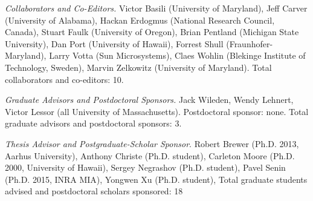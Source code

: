 \begin{Collaborators and other affiliations}
\item {\em Collaborators and Co-Editors.} 
Victor Basili (University of Maryland),
Jeff Carver (University of Alabama),
Hackan Erdogmus (National Research Council, Canada), 
Stuart Faulk (University of Oregon),
Brian Pentland (Michigan State University),
Dan Port (University of Hawaii),
Forrest Shull (Fraunhofer-Maryland),
Larry Votta (Sun Microsystems),
Claes Wohlin (Blekinge Institute of Technology, Sweden),
Marvin Zelkowitz (University of Maryland).
Total collaborators and co-editors: 10.
\medskip

\item {\em Graduate Advisors and Postdoctoral Sponsors.} 
Jack Wileden, Wendy Lehnert, Victor Lessor (all University of Massachusetts).  Postdoctoral sponsor: none.  Total graduate advisors and postdoctoral sponsors: 3.
\medskip

\item {\em Thesis Advisor and Postgraduate-Scholar Sponsor}. 
Robert Brewer (Ph.D. 2013, Aarhus University),
Anthony Christe (Ph.D. student),
Carleton Moore (Ph.D. 2000, University of Hawaii),
Sergey Negrashov (Ph.D. student),
Pavel Senin (Ph.D. 2015, INRA MIA),
Yongwen Xu (Ph.D. student), 
Total graduate students advised and postdoctoral scholars sponsored: 18
\end{Collaborators and other affiliations}







